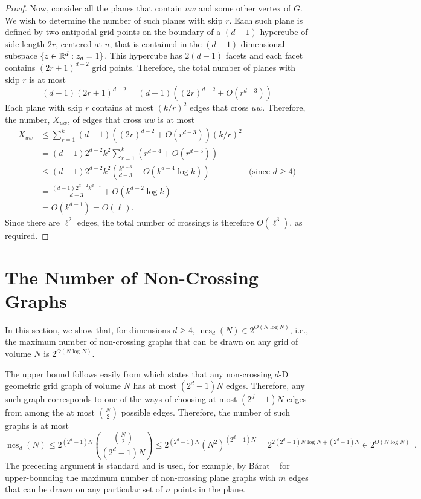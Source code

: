 \documentclass{patmorin}
\newcommand{\n}{N}
\DeclareMathOperator{\ncs}{ncs}
\begin{document}
\begin{proof}
  Now, consider all the planes that contain $uw$ and some other vertex
  of $G$.  We wish to determine the number of such planes with skip $r$.
  Each such plane is defined by two antipodal grid points on the boundary
  of a $(d-1)$-hypercube of side length $2r$, centered at $u$, that is
  contained in the $(d-1)$-dimensional subspace $\{z\in\mathbb{R}^d:z_d=1\}$.
  This hypercube has $2(d-1)$ facets and each facet contains
  $(2r+1)^{d-2}$ grid points.  Therefore, the total number of planes with
  skip $r$ is at most
  \[
     (d-1)(2r+1)^{d-2} = (d-1)\left((2r)^{d-2} + O(r^{d-3})\right)
  \]
  Each plane with skip $r$ contains at most $(k/r)^2$ edges that cross
  $uw$.  Therefore, the number, $X_{uw}$, of edges that cross $uw$
  is at most
  \begin{align*}
     X_{uw} & \le \sum_{r=1}^k(d-1)\left((2r)^{d-2}+O(r^{d-3})\right)(k/r)^2 \\
         & = (d-1)2^{d-2}k^2\sum_{r=1}^k\left(r^{d-4} + O(r^{d-5})\right) \\
         & \le (d-1)2^{d-2}k^2\left(\frac{k^{d-3}}{d-3} 
             + O\left(k^{d-4}\log k\right)\right) 
               & \text{(since $d\ge 4$)} \\
         & = \frac{(d-1)2^{d-2}k^{d-1}}{d-3} + O(k^{d-2}\log k) \\
         & = O(k^{d-1}) = O(\ell).
  \end{align*}
  Since there are $\ell^2$ edges, the total number of crossings is
  therefore $O(\ell^3)$, as required.
\end{proof}

\section{The Number of Non-Crossing Graphs}

In this section, we show that, for dimensions $d\ge 4$, $\ncs_d(\n)\in
2^{\Theta(\n\log\n)}$, i.e., the maximum number of non-crossing graphs
that can be drawn on any grid of volume $\n$ is $2^{\Theta(\n\log\n)}$.

The upper bound follows easily from  which states that
any non-crossing $d$-D geometric grid graph of volume $\n$ has at most
$(2^d-1)\n$ edges.  Therefore, any such graph corresponds to one of
the ways of choosing at most $(2^d-1)\n$ edges from among the at most
$\binom{\n}{2}$ possible edges.  Therefore, the number of such graphs is
at most
\[
  \ncs_d(\n) \le 2^{(2^d-1)\n}\binom{\binom{\n}{2}}{(2^d-1)\n} 
      \le 2^{(2^d-1)\n} (\n^{2})^{(2^d-1)\n} 
      = 2^{2(2^d-1)\n\log\n+(2^d-1)\n} 
      \in 2^{O(\n\log\n)} \enspace .
\]
The preceding argument is standard and is used, for example, by B\'arat
\etal~\cite[Lemma~4]{barat.matousek.ea:bounded-degree} for upper-bounding
the maximum number of non-crossing plane graphs with $m$ edges that can
be drawn on any particular set of $n$ points in the plane.
\end{document}
